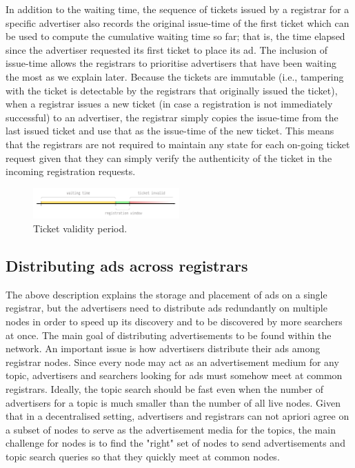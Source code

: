 In addition to the waiting time,  the sequence of tickets issued by a registrar for a specific advertiser also records the original issue-time of the first ticket which can be used to compute the cumulative waiting time so far; that is, the time elapsed since the advertiser requested its first ticket to place its ad. The inclusion of issue-time allows the registrars to prioritise advertisers that have been waiting the most as we explain later. Because the tickets are immutable (i.e., tampering with the ticket is detectable by the registrars that originally issued the ticket), when a registrar issues a new ticket (in case a registration is not immediately successful) to an advertiser, the registrar simply copies the issue-time from the last issued ticket and use that as the issue-time of the new ticket. This means that the registrars are not required to maintain any state for each on-going ticket request given that they can simply verify the authenticity of the ticket in the incoming registration requests. 

    
\begin{figure}
    \includegraphics[width=0.5\textwidth]{img/ticket-validity}
    \caption{Ticket validity period.}
    \label{fig:ticket_validity}
\end{figure}

\subsection{Distributing ads across registrars}

The above description explains the storage and placement of ads on a single registrar, but the advertisers need to distribute ads redundantly on multiple nodes in order to speed up its discovery and to be discovered by more searchers at once. 
The main goal of distributing advertisements to be found within the network. An important issue is how advertisers distribute their ads among registrar nodes. 
Since every node may act as an advertisement medium for any topic,  advertisers and searchers looking for ads must somehow meet at common registrars. 
Ideally, the topic search should be fast even when the number of advertisers for a topic is much smaller than the number of all live nodes. Given that in a decentralised setting, advertisers and registrars can not apriori agree on a subset of nodes to serve as the advertisement media for the topics, the main challenge for nodes is to find the "right" set of nodes to send advertisements and topic search queries so that they quickly meet at common nodes.

